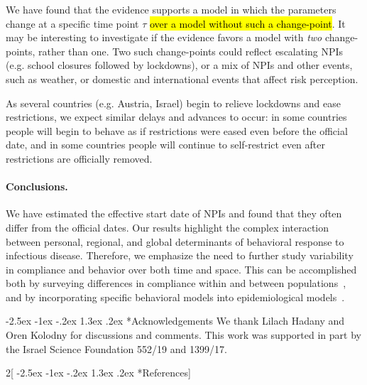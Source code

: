 \documentclass[12pt]{extarticle}
\makeatletter
\renewcommand\section{\@startsection {section}{1}{\z@}%
     {-2.5ex \@plus -1ex \@minus -.2ex}%
     {1.3ex \@plus.2ex}%
    {\Large\bfseries}}
\makeatother
\begin{document}
We have found that the evidence supports a model in which the parameters change at a specific time point $\tau$ \hl{over a model without such a change-point}. It may be interesting to investigate if the evidence favors a model with \emph{two} change-points, rather than one. 
Two such change-points could reflect escalating NPIs (e.g. school closures followed by lockdowns), or a mix of NPIs and other events, such as weather, or domestic and international events that affect risk perception.

As several countries (e.g. Austria, Israel) begin to relieve lockdowns and ease restrictions, we expect similar delays and advances to occur: in some countries people will begin to behave as if restrictions were eased even before the official date, and in some countries people will continue to self-restrict even after restrictions are officially removed.

\paragraph*{Conclusions.}
We have estimated the effective start date of NPIs and found that they often differ from the official dates.
Our results highlight the complex interaction between personal, regional, and global determinants of behavioral response to infectious disease.
Therefore, we emphasize the need to further study variability in compliance and behavior over both time and space. This can be accomplished both by surveying differences in compliance within and between populations~\citep{Atchison2020}, and by incorporating specific behavioral models into epidemiological models~\citep{Fenichela2011,Walters2013,Arthur2020}.

{\small
\section*{Acknowledgements}
We thank Lilach Hadany and Oren Kolodny for discussions and comments.
This work was supported in part by the Israel Science Foundation 552/19 and 1399/17.
}


\pagebreak
\begin{multicols}{2}[\section*{References}]
\nolinenumbers

%

\end{multicols}
\end{document}
